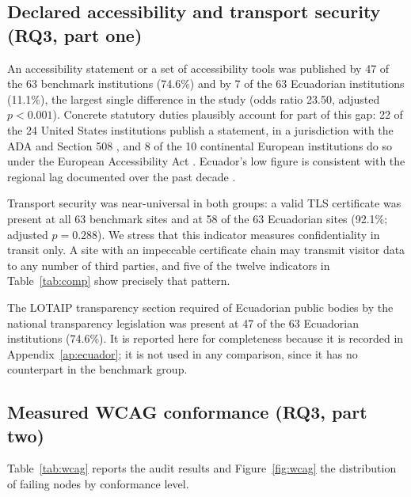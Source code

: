 \documentclass[pdflatex,sn-basic,Numbered]{sn-jnl}
\theoremstyle{thmstyleone}
\theoremstyle{thmstyletwo}
\theoremstyle{thmstylethree}
\begin{document}
\subsection{Declared accessibility and transport security (RQ3, part one)}\label{sec:results-declared}

An accessibility statement or a set of accessibility tools was published by 47 of the 63 benchmark institutions (74.6\%) and by 7 of the 63 Ecuadorian institutions (11.1\%), the largest single difference in the study (odds ratio 23.50, adjusted $p<0.001$). Concrete statutory duties plausibly account for part of this gap: 22 of the 24 United States institutions publish a statement, in a jurisdiction with the ADA and Section 508 \citep{ada1990,section508}, and 8 of the 10 continental European institutions do so under the European Accessibility Act \citep{eaa2019}. Ecuador's low figure is consistent with the regional lag documented over the past decade \citep{campoverdemolina2023accessibility,acostavargas2020dataset}.

Transport security was near-universal in both groups: a valid TLS certificate was present at all 63 benchmark sites and at 58 of the 63 Ecuadorian sites (92.1\%; adjusted $p=0.288$). We stress that this indicator measures confidentiality in transit only. A site with an impeccable certificate chain may transmit visitor data to any number of third parties, and five of the twelve indicators in Table~\ref{tab:comp} show precisely that pattern.

The LOTAIP transparency section required of Ecuadorian public bodies by the national transparency legislation was present at 47 of the 63 Ecuadorian institutions (74.6\%). It is reported here for completeness because it is recorded in Appendix~\ref{ap:ecuador}; it is not used in any comparison, since it has no counterpart in the benchmark group.

\subsection{Measured WCAG conformance (RQ3, part two)}\label{sec:results-wcag}

Table~\ref{tab:wcag} reports the audit results and Figure~\ref{fig:wcag} the distribution of failing nodes by conformance level.
\end{document}

